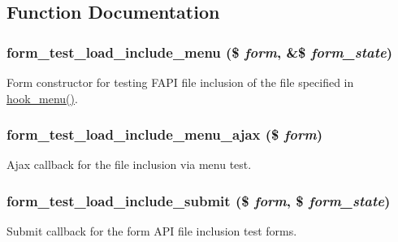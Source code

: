 \subsection{Function Documentation}
\hypertarget{form__test_8file_8inc_a8541cacf0e13a752a3329eed7dbe9022}{
\subsubsection[{form\_\-test\_\-load\_\-include\_\-menu}]{\setlength{\rightskip}{0pt plus 5cm}form\_\-test\_\-load\_\-include\_\-menu (\$ {\em form}, \/  \&\$ {\em form\_\-state})}}
\label{form__test_8file_8inc_a8541cacf0e13a752a3329eed7dbe9022}
Form constructor for testing FAPI file inclusion of the file specified in \hyperlink{group__hooks_ga5c95244fea59b25666e409759e133ded}{hook\_\-menu()}. \hypertarget{form__test_8file_8inc_a72729f4f41be302b7921a375fe05da6a}{
\subsubsection[{form\_\-test\_\-load\_\-include\_\-menu\_\-ajax}]{\setlength{\rightskip}{0pt plus 5cm}form\_\-test\_\-load\_\-include\_\-menu\_\-ajax (\$ {\em form})}}
\label{form__test_8file_8inc_a72729f4f41be302b7921a375fe05da6a}
Ajax callback for the file inclusion via menu test. \hypertarget{form__test_8file_8inc_aa9a7c6ed94f2a375804faa39d19f62e0}{
\subsubsection[{form\_\-test\_\-load\_\-include\_\-submit}]{\setlength{\rightskip}{0pt plus 5cm}form\_\-test\_\-load\_\-include\_\-submit (\$ {\em form}, \/  \$ {\em form\_\-state})}}
\label{form__test_8file_8inc_aa9a7c6ed94f2a375804faa39d19f62e0}
Submit callback for the form API file inclusion test forms. 